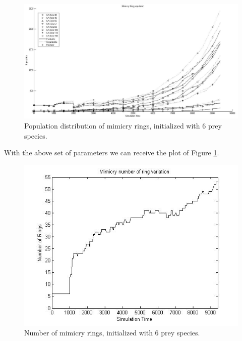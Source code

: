 \begin{figure}[H]
	\centering
	\includegraphics[scale=0.40]{images/simTime10k-6Prey}
	\caption{Population distribution of mimicry rings, initialized with 6 prey species.}
	\label{fig:plot-6-prey}
\end{figure}

With the above set of parameters we can receive the plot of Figure \ref{fig:plot-6-prey}. 

\begin{figure}[H]
	\centering
	\includegraphics[scale=0.50]{images/ringSize10k-6Prey}
	\caption{Number of mimicry rings, initialized with 6 prey species.}
	\label{fig:ringSize10k-6-Prey}
\end{figure}

